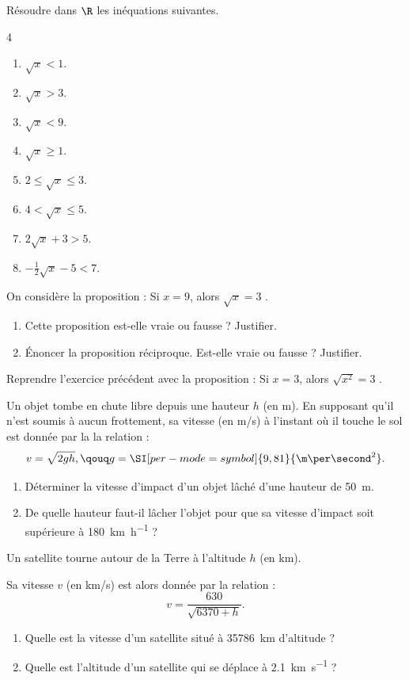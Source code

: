 \exo

Résoudre dans $\R$ les inéquations suivantes.

\vspace{-6pt}
\setlength{\columnsep}{1cm}
\setlength{\columnseprule}{0pt}
\begin{multicols}{4}
\begin{enumerate}
\item $\sqrt{x}<1$.
\medskip
\item $\sqrt{x}>3$.
\item $\sqrt{x} < 9$.
\medskip
\item $\sqrt{x} \geqslant 1$.
\item $2\leqslant \sqrt{x} \leqslant 3$.
\medskip
\item $4< \sqrt{x} \leqslant 5$.
\item $2\sqrt{x}+3 > 5$.
\medskip
\item $-\frac{1}{2}\sqrt{x}-5 < 7$.
\end{enumerate}
\end{multicols}
\vspace{-6pt}

\exo

On considère la proposition : \og Si $x=9$, alors $\sqrt{x}=3$ \fg{}.
\begin{enumerate}
\item Cette proposition est-elle vraie ou fausse ? Justifier.
\item Énoncer la proposition réciproque. Est-elle vraie ou fausse ? Justifier.
\end{enumerate}

\exo

Reprendre l'exercice précédent avec la proposition : \og Si $x=3$, alors $\sqrt{x^2}=3$ \fg{}.

\exo

Un objet tombe en chute libre depuis une hauteur $h$ (en \si{\m}). En supposant qu'il n'est soumis à aucun frottement, sa vitesse (en \si[per-mode=symbol]{\m\per\second}) à l'instant où il touche le sol est donnée par la la relation :
\[v=\sqrt{2gh}, \qouq g=\SI[per-mode=symbol]{9,81}{\m\per\second^2}.\]
\begin{enumerate}
\item Déterminer la vitesse d'impact d'un objet lâché d'une hauteur de \SI{50}{\m}.
\item De quelle hauteur faut-il lâcher l'objet pour que sa vitesse d'impact soit supérieure à \SI[per-mode=symbol]{180}{\km\per\hour} ?
\end{enumerate}

\exo

Un satellite tourne autour de la Terre à l'altitude $h$ (en \si{\km}).

Sa vitesse $v$ (en \si[per-mode=symbol]{\km\per\second}) est alors donnée par la relation :
\[v=\frac{630}{\sqrt{6370+h}}.\]
\begin{enumerate}
\item Quelle est la vitesse d'un satellite situé à \SI[retain-explicit-plus]{35786}{\km} d'altitude ?
\item Quelle est l'altitude d'un satellite qui se déplace à \SI[per-mode=symbol]{2,1}{\km\per\second} ?
\end{enumerate}

